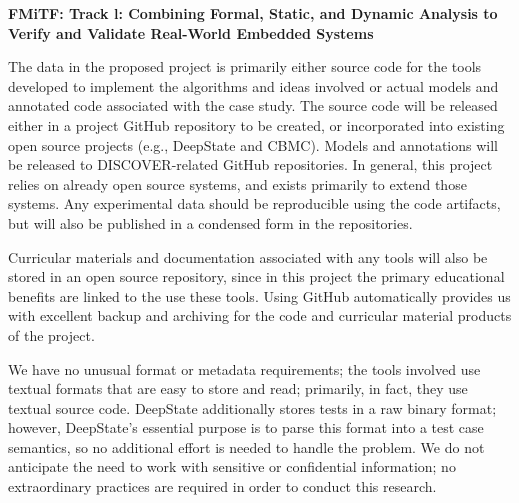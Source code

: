 \documentclass[12pt]{article}
\begin{document}

\begin{center}
  {\Large\sf\textbf{FMiTF: Track l: Combining Formal, Static, and
  Dynamic Analysis to Verify and Validate Real-World Embedded Systems}}
\end{center}

The data in the proposed project is primarily either source code for
the tools developed to implement the algorithms and ideas involved or
actual models and annotated code associated with the case study.  The source code will be released either in a project GitHub repository to be created, or incorporated into existing open source projects (e.g., DeepState and CBMC).  Models and annotations will be released to DISCOVER-related GitHub repositories.  In general, this project relies on already open source systems, and exists primarily to extend those systems.  Any experimental data should be reproducible using the code artifacts, but will also be published in a condensed form in the repositories.

Curricular
materials and documentation associated with any tools will also be stored in
an open source repository, since in this project the primary
educational benefits are linked to the use these tools.  Using GitHub automatically provides us with excellent backup
and archiving for the code and curricular material products of the
project.

We have no unusual format or metadata requirements; the
tools involved use textual formats that are easy to store and read;
primarily, in fact, they use textual source code.  DeepState additionally stores tests in a raw binary format; however, DeepState's essential purpose is to parse this format into a test case semantics, so no additional effort is needed to handle the problem.  
We do not anticipate the need to work with sensitive or confidential
information; no extraordinary practices are required in order to
conduct this research.
\end{document}
